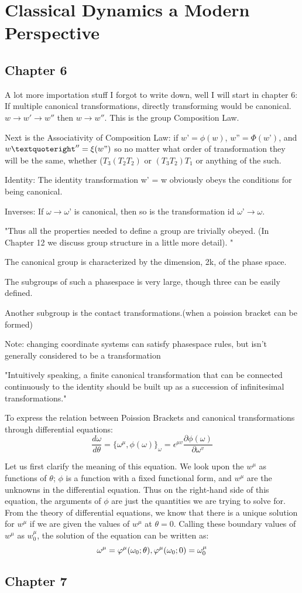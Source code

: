  \section{Classical Dynamics a Modern Perspective}
 \subsection{Chapter 6}
 A lot more importation stuff I forgot to write down, well I will start in chapter 6:
 If multiple canonical transformations, directly transforming would be canonical. $w \to w' \to w''$ then $w \to w''$. This is the group Composition Law.
 
 Next is the Associativity of Composition Law: 
 if $w’= \phi(w)$, $w” = \Phi(w’)$, and $w’'' = \xi(w")$
 so no matter what order of transformation they will be the same, whether ($T_3(T_2T_2)$ or $(T_3T_2)T_1$ or anything of the such.
 
 Identity: The identity transformation w’ = w obviously obeys the conditions for being canonical.

Inverses: If $\omega \to \omega’$ is canonical, then so is the transformation 
id $\omega’ \to \omega$. 

"Thus all the properties needed to define a group are trivially obeyed. (In 
Chapter 12 we discuss group structure in a little more detail). "

The canonical group is characterized by the dimension, 2k, 
of the phase space. 

The subgroups of such a phasespace is very large, though three can be easily defined.

Another subgroup is the contact transformations.(when a poission bracket can be formed)

Note: changing coordinate systems can satisfy phasespace rules, but isn't generally considered to be a transformation

"Intuitively speaking, a finite canonical transformation that can be 
connected continuously to the identity should be built up as a succession of 
infinitesimal transformations."

To express the relation between Poission Brackets and canonical transformations through differential equations:
$$\frac{d \omega}{d \theta}= \{\omega^\mu, \phi(\omega)\}_\omega= \epsilon^{\mu v}\frac{\partial \phi(\omega)}{\partial \omega^v}$$

Let us first clarify the meaning of this equation. We look upon the $w^\mu$ as 
functions of $\theta$; $\phi$ is a function with a fixed functional form, and $w^\mu$ are the unknowns in the differential equation. Thus on the right-hand side of this equation, the arguments of $\phi$ are just the quantities we are trying to solve for. From the theory of differential equations, we know that there is a unique solution for $w^\mu$ if we are given the values of $w^\mu$ at $\theta = 0$. Calling these boundary values of $w^\mu$ as $w^\mu_0$, the solution of the equation can be written as: 
$$\omega^\mu= \varphi^\mu(\omega_0; \theta), \space \space \space \varphi^\mu(\omega_0; 0) = \omega^\mu_0$$

\subsection{Chapter 7}
